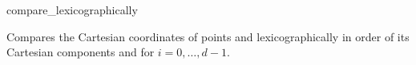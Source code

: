 \begin{ccRefFunction}{compare_lexicographically}

{Compares the Cartesian coordinates of points  and
  lexicographically in order of its Cartesian 
 components  and 
 for $i = 0,\ldots,d-1$.}
\end{ccRefFunction}

